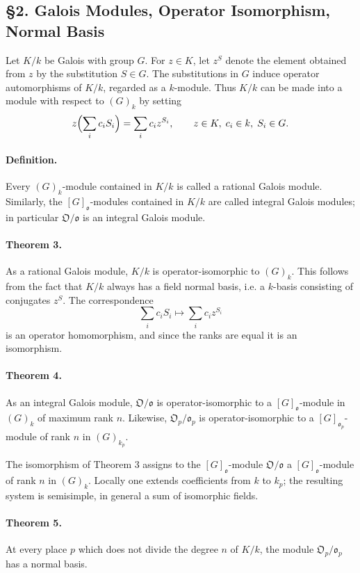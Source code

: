 \documentclass[11pt]{article}
\providecommand{\frako}{\mathfrak o}
\providecommand{\frako}{\mathfrak o}
\providecommand{\frakO}{\mathfrak O}
\begin{document}
\subsection*{§2. Galois Modules, Operator Isomorphism, Normal Basis}

Let \(K/k\) be Galois with group \(G\). For \(z\in K\), let \(z^S\) denote the element obtained from \(z\) by the substitution \(S\in G\). The substitutions in \(G\) induce operator automorphisms of \(K/k\), regarded as a \(k\)-module. Thus \(K/k\) can be made into a module with respect to \((G)_k\) by setting
\[
        z\Bigl(\sum_i c_iS_i\Bigr)=\sum_i c_i z^{S_i},
        \qquad z\in K,\; c_i\in k,\; S_i\in G.
\]

\paragraph{Definition.}
Every \((G)_k\)-module contained in \(K/k\) is called a rational Galois module. Similarly, the \([G]_{\frako}\)-modules contained in \(K/k\) are called integral Galois modules; in particular \(\frakO/\frako\) is an integral Galois module.

\paragraph{Theorem 3.}
As a rational Galois module, \(K/k\) is operator-isomorphic to \((G)_k\). This follows from the fact that \(K/k\) always has a field normal basis, i.e. a \(k\)-basis consisting of conjugates \(z^S\). The correspondence
\[
        \sum_i c_iS_i\longmapsto \sum_i c_i z^{S_i}
\]
is an operator homomorphism, and since the ranks are equal it is an isomorphism.

\paragraph{Theorem 4.}
As an integral Galois module, \(\frakO/\frako\) is operator-isomorphic to a \([G]_{\frako}\)-module in \((G)_k\) of maximum rank \(n\). Likewise, \(\frakO_p/\frako_p\) is operator-isomorphic to a \([G]_{\frako_p}\)-module of rank \(n\) in \((G)_{k_p}\).

The isomorphism of Theorem 3 assigns to the \([G]_{\frako}\)-module \(\frakO/\frako\) a \([G]_{\frako}\)-module of rank \(n\) in \((G)_k\). Locally one extends coefficients from \(k\) to \(k_p\); the resulting system is semisimple, in general a sum of isomorphic fields.

\paragraph{Theorem 5.}
At every place \(p\) which does not divide the degree \(n\) of \(K/k\), the module \(\frakO_p/\frako_p\) has a normal basis.
\end{document}
